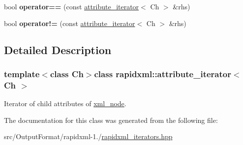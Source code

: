 \begin{DoxyCompactItemize}
\item 
\hypertarget{classrapidxml_1_1attribute__iterator_ab1dc8dd11d21e145a4e3f76d46aead0d}{bool {\bfseries operator==} (const \hyperlink{classrapidxml_1_1attribute__iterator}{attribute\-\_\-iterator}$<$ Ch $>$ \&rhs)}\label{classrapidxml_1_1attribute__iterator_ab1dc8dd11d21e145a4e3f76d46aead0d}

\item 
\hypertarget{classrapidxml_1_1attribute__iterator_a39e8cf336c324521fd9c720abf280d88}{bool {\bfseries operator!=} (const \hyperlink{classrapidxml_1_1attribute__iterator}{attribute\-\_\-iterator}$<$ Ch $>$ \&rhs)}\label{classrapidxml_1_1attribute__iterator_a39e8cf336c324521fd9c720abf280d88}

\end{DoxyCompactItemize}


\subsection{Detailed Description}
\subsubsection*{template$<$class Ch$>$class rapidxml\-::attribute\-\_\-iterator$<$ Ch $>$}

Iterator of child attributes of \hyperlink{classrapidxml_1_1xml__node}{xml\-\_\-node}. 

The documentation for this class was generated from the following file\-:\begin{DoxyCompactItemize}
\item 
src/\-Output\-Format/rapidxml-\/1./\hyperlink{rapidxml__iterators_8hpp}{rapidxml\-\_\-iterators.\-hpp}\end{DoxyCompactItemize}
